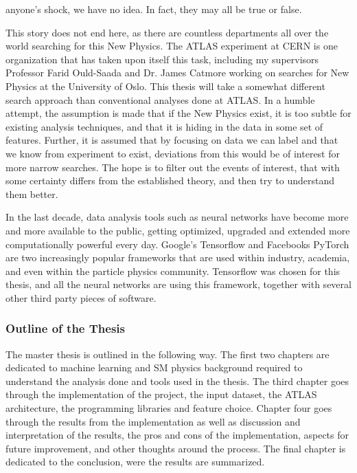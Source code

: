 anyone's shock, we have no idea. In fact, they may all be true or false.\par 
This story does not end here, as there are countless departments all 
over the world searching for this New Physics. The ATLAS experiment at CERN is one organization that 
has taken upon itself this task, including my supervisors Professor Farid Ould-Saada and 
Dr. James Catmore working on searches for New Physics at the University of Oslo. This thesis will take a somewhat different search 
approach than conventional analyses done at ATLAS. In a humble attempt, the assumption is made that 
if the New Physics exist, it is too subtle for existing analysis techniques, and that it is hiding in the data
in some set of features. Further, it is assumed that by focusing on data we can label and that we know 
from experiment to exist, deviations from this would be of interest for more narrow searches. The hope is 
to filter out the events of interest, that with some certainty differs from the established theory, 
and then try to understand them better. \par 
In the last decade, data analysis tools such as neural networks have become more and more available 
to the public, getting optimized, upgraded and extended more computationally powerful every 
day. Google's Tensorflow\cite{tensorflow-whitepaper} and Facebooks PyTorch\cite{paszkepytorch} 
are two increasingly popular frameworks that are used within industry, 
academia, and even within the particle physics community. Tensorflow was chosen for this thesis, and 
all the neural networks are using this framework, together with several other third party pieces of software. \par 

\subsubsection*{Outline of the Thesis}
The master thesis is outlined in the following way. The first two chapters are dedicated to machine learning and
SM physics background required to understand the analysis done and tools used in the thesis. The third chapter goes 
through the implementation of the project, the input dataset, the ATLAS architecture, the programming libraries and
feature choice. Chapter four goes through the results from the implementation as well as discussion and 
interpretation of the results, the pros and cons of the implementation, aspects for future improvement, and other thoughts around the process.
The final chapter is dedicated to the conclusion, were the results are summarized. 


